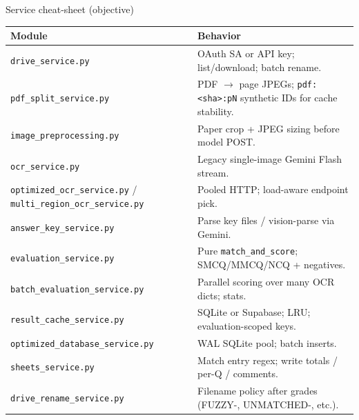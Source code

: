 \documentclass[aspectratio=169]{beamer}
\begin{document}
\begin{frame}{Service cheat-sheet (objective)}
  \tiny
  \begin{tabular}{@{}p{3.35cm}p{10.35cm}@{}}
    \toprule
    Module & Behavior \\
    \midrule
    \texttt{drive\_service.py} & OAuth SA or API key; list/download; batch rename. \\
    \texttt{pdf\_split\_service.py} & PDF $\rightarrow$ page JPEGs; \texttt{pdf:<sha>:pN} synthetic IDs for cache stability. \\
    \texttt{image\_preprocessing.py} & Paper crop + JPEG sizing before model POST. \\
    \texttt{ocr\_service.py} & Legacy single-image Gemini Flash stream. \\
    \texttt{optimized\_ocr\_service.py} / \texttt{multi\_region\_ocr\_service.py} & Pooled HTTP; load-aware endpoint pick. \\
    \texttt{answer\_key\_service.py} & Parse key files / vision-parse via Gemini. \\
    \texttt{evaluation\_service.py} & Pure \texttt{match\_and\_score}; SMCQ/MMCQ/NCQ + negatives. \\
    \texttt{batch\_evaluation\_service.py} & Parallel scoring over many OCR dicts; stats. \\
    \texttt{result\_cache\_service.py} & SQLite or Supabase; LRU; evaluation-scoped keys. \\
    \texttt{optimized\_database\_service.py} & WAL SQLite pool; batch inserts. \\
    \texttt{sheets\_service.py} & Match entry regex; write totals / per-Q / comments. \\
    \texttt{drive\_rename\_service.py} & Filename policy after grades (FUZZY-, UNMATCHED-, etc.). \\
    \bottomrule
  \end{tabular}
\end{frame}
\end{document}

